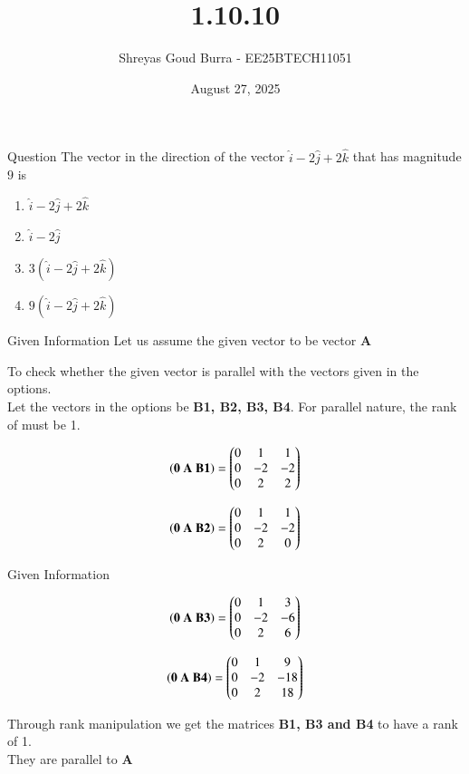 \documentclass{beamer}
\title %
{1.10.10}
\date{August 27, 2025}
\author 
{Shreyas Goud Burra - EE25BTECH11051}
\begin{document}
\frame{\titlepage}
\begin{frame}{Question}
The vector in the direction of the vector $\hat{i} - 2\hat{j} + 2\hat{k}$ that has magnitude $9$ is
\begin{enumerate}[label=(\alph*)]
    \item $\hat{i}-2\hat{j}+2\hat{k}$
    \item $\hat{i}-2\hat{j}$
    \item $3(\hat{i}-2\hat{j}+2\hat{k})$
    \item $9(\hat{i}-2\hat{j}+2\hat{k})$
\end{enumerate}

\end{frame}

\begin{frame}{Given Information}
    Let us assume the given vector to be vector \textbf{A}

To check whether the given vector is parallel with the vectors given in the options.\\
Let the vectors in the options be \textbf{B1, B2, B3, B4}. For parallel nature, the rank of  must be 1.

\begin{align}
    \left(\textbf{0 A B1}\right) = \begin{pmatrix}0&1&1\\0&-2&-2\\0&2&2\end{pmatrix}
    \label{4.2}
\end{align}

\begin{align}
    \left(\textbf{0 A B2}\right) = \begin{pmatrix}0&1&1\\0&-2&-2\\0&2&0\end{pmatrix}
    \label{4.3}
\end{align}


\end{frame}
\begin{frame}{Given Information}

\begin{align}
    \left(\textbf{0 A B3}\right) = \begin{pmatrix}0&1&3\\0&-2&-6\\0&2&6\end{pmatrix}
    \label{4.4}
\end{align}

\begin{align}
    \left(\textbf{0 A B4}\right) = \begin{pmatrix}0&1&9\\0&-2&-18\\0&2&18\end{pmatrix}
    \label{4.5}
\end{align}

Through rank manipulation we get the matrices \textbf{B1, B3 and B4} to have a rank of 1.\\
They are parallel to \textbf{A}\\
\end{frame}
\end{document}
